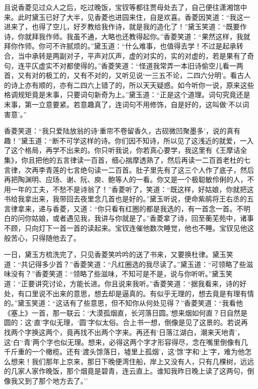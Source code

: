 且说香菱见过众人之后，吃过晚饭，宝钗等都往贾母处去了，自己便往潇湘馆中来。此时黛玉已好了大半，见香菱也进园来住，自是欢喜。香菱因笑道：``我这一进来了，也得了空儿，好歹教给我作诗，就是我的造化了！''黛玉笑道：``既要作诗，你就拜我作师。我虽不通，大略也还教得起你。''香菱笑道：``果然这样，我就拜你作师。你可不许腻烦的。''黛玉道：``什么难事，也值得去学！不过是起承转合，当中承转是两副对子，平声对仄声，虚的对实的，实的对虚的，若是果有了奇句，连平仄虚实不对都使得的。''香菱笑道：``怪道我常弄一本旧诗偷空儿看一两首，又有对的极工的，又有不对的，又听见说`一三五不论，二四六分明'。看古人的诗上亦有顺的，亦有二四六上错了的，所以天天疑惑。如今听你一说，原来这些格调规矩竟是末事，只要词句新奇为上。''黛玉道：``正是这个道理。词句究竟还是末事，第一立意要紧。若意趣真了，连词句不用修饰，自是好的，这叫做`不以词害意'。''

香菱笑道：``我只爱陆放翁的诗`重帘不卷留香久，古砚微凹聚墨多'，说的真有趣！''黛玉道：``断不可学这样的诗。你们因不知诗，所以见了这浅近的就爱，一入了这个格局，再学不出来的。你只听我说，你若真心要学，我这里有《王摩诘全集》，你且把他的五言律读一百首，细心揣摩透熟了，然后再读一二百首老杜的七言律，次再李青莲的七言绝句读一二百首。肚子里先有了这三个人作了底子，然后再把陶渊明、应玚、谢、阮、庾、鲍等人的一看。你又是一个极聪敏伶俐的人，不用一年的工夫，不愁不是诗翁了！''香菱听了，笑道：``既这样，好姑娘，你就把这书给我拿出来，我带回去夜里念几首也是好的。''黛玉听说，便命紫鹃将王右丞的五言律拿来，递与香菱，又道：``你只看有红圈的都是我选的，有一首念一首。不明白的问你姑娘，或者遇见我，我讲与你就是了。''香菱拿了诗，回至蘅芜苑中，诸事不顾，只向灯下一首一首的读起来。宝钗连催他数次睡觉，他也不睡。宝钗见他这般苦心，只得随他去了。

一日，黛玉方梳洗完了，只见香菱笑吟吟的送了书来，又要换杜律。黛玉笑道：``共记得多少首？''香菱笑道：``凡红圈选的我尽读了。''黛玉道：``可领略了些滋味没有？''香菱笑道：``领略了些滋味，不知可是不是，说与你听听。''黛玉笑道：``正要讲究讨论，方能长进。你且说来我听。''香菱笑道：``据我看来，诗的好处，有口里说不出来的意思，想去却是逼真的。有似乎无理的，想去竟是有理有情的。''黛玉笑道：``这话有了些意思，但不知你从何处见得？''香菱笑道：``我看他《塞上》一首，那一联云：`大漠孤烟直，长河落日圆。'想来烟如何直？日自然是圆的：这`直'字似无理，`圆'字似太俗。合上书一想，倒像是见了这景的。若说再找两个字换这两个，竟再找不出两个字来。再还有`日落江湖白，潮来天地青'，这`白'`青'两个字也似无理。想来，必得这两个字才形容得尽，念在嘴里倒像有几千斤重的一个橄榄。还有`渡头馀落日，墟里上孤烟'，这`馀'字和`上'字，难为他怎么想来！我们那年上京来，那日下晚便湾住船，岸上又没有人，只有几棵树，远远的几家人家作晚饭，那个烟竟是碧青，连云直上。谁知我昨日晚上读了这两句，倒像我又到了那个地方去了。''

